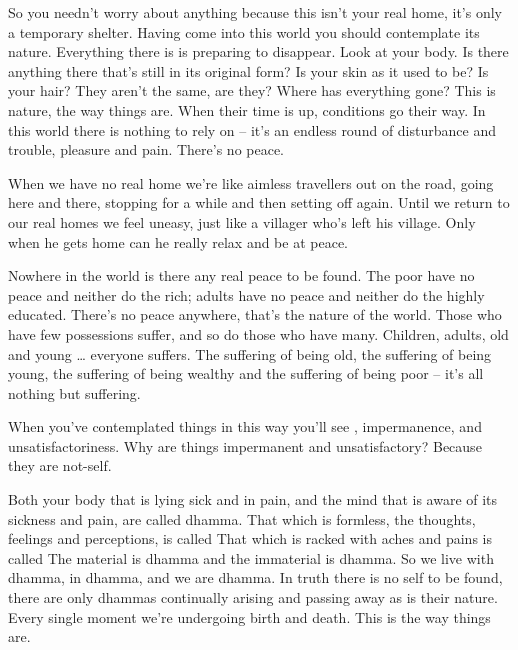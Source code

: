 So you needn't worry about anything because this isn't your real home, it's only a temporary shelter. Having come into this world you should contemplate its nature. Everything there is is preparing to disappear. Look at your body. Is there anything there that's still in its original form? Is your skin as it used to be? Is your hair? They aren't the same, are they? Where has everything gone? This is nature, the way things are. When their time is up, conditions go their way. In this world there is nothing to rely on -- it's an endless round of disturbance and trouble, pleasure and pain. There's no peace.

When we have no real home we're like aimless travellers out on the road, going here and there, stopping for a while and then setting off again. Until we return to our real homes we feel uneasy, just like a villager who's left his village. Only when he gets home can he really relax and be at peace.

Nowhere in the world is there any real peace to be found. The poor have no peace and neither do the rich; adults have no peace and neither do the highly educated. There's no peace anywhere, that's the nature of the world. Those who have few possessions suffer, and so do those who have many. Children, adults, old and young \ldots{} everyone suffers. The suffering of being old, the suffering of being young, the suffering of being wealthy and the suffering of being poor -- it's all nothing but suffering.

When you've contemplated things in this way you'll see , impermanence, and  unsatisfactoriness. Why are things impermanent and unsatisfactory? Because they are  not-self.

Both your body that is lying sick and in pain, and the mind that is aware of its sickness and pain, are called dhamma. That which is formless, the thoughts, feelings and perceptions, is called  That which is racked with aches and pains is called  The material is dhamma and the immaterial is dhamma. So we live with dhamma, in dhamma, and we are dhamma. In truth there is no self to be found, there are only dhammas continually arising and passing away as is their nature. Every single moment we're undergoing birth and death. This is the way things are.

